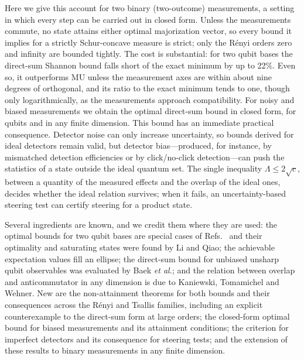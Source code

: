 \documentclass[11pt]{article}
\theoremstyle{definition}
\begin{document}
Here we give this account for two binary (two-outcome) measurements, a setting
in which every step can be carried out in closed form. Unless the measurements
commute, no state attains either optimal majorization vector, so every bound it
implies for a strictly Schur-concave measure is strict; only the R\'enyi orders
zero and infinity are bounded tightly. The cost is substantial: for two qubit
bases the direct-sum Shannon bound falls short of the exact minimum by up to
22\%. Even so, it outperforms MU unless the measurement axes are within about
nine degrees of orthogonal, and its ratio to the exact minimum tends to one,
though only logarithmically, as the measurements approach compatibility. For
noisy and biased measurements we obtain the optimal direct-sum bound in closed
form, for qubits and in any finite dimension. This bound has an immediate
practical consequence. Detector noise can only increase uncertainty, so bounds
derived for ideal detectors remain valid, but detector bias---produced, for
instance, by mismatched detection efficiencies or by click/no-click
detection---can push the statistics of a state outside the ideal quantum set.
The single inequality $\Lambda\le2\sqrt c$, between a quantity of the measured
effects and the overlap of the ideal ones, decides whether the ideal relation
survives; when it fails, an uncertainty-based steering test can certify steering
for a product state.

Several ingredients are known, and we credit them where they are used: the
optimal bounds for two qubit bases are special cases of
Refs.~ and their optimality and saturating
states were found by Li and Qiao\cite{LiQiao2019}; the achievable expectation
values fill an ellipse\cite{LiQiao2015,KTW2014,Abbott2016}; the direct-sum bound
for unbiased unsharp qubit observables was evaluated by Baek
\emph{et al.}\cite{Baek2019}; and the relation between overlap and
anticommutator in any dimension is due to Kaniewski, Tomamichel and
Wehner\cite{KTW2014}. New are the non-attainment theorems for both bounds and
their consequences across the R\'enyi and Tsallis families, including an
explicit counterexample to the direct-sum form at large orders; the closed-form
optimal bound for biased measurements and its attainment conditions; the
criterion for imperfect detectors and its consequence for steering tests; and
the extension of these results to binary measurements in any finite dimension.

\end{document}

